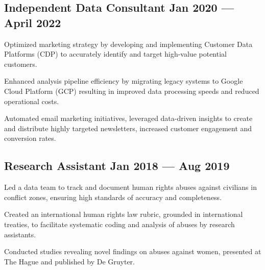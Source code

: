 \documentclass[singlesided, paper=a4, fontsize=10.5pt]{testing-class}
\begin{document}
{    \subsection{Independent Data Consultant \hfill Jan 2020 --- April 2022}
    \begin{zitemize}
        \item Optimized marketing strategy by developing and implementing Customer Data Platforms (CDP) to accurately identify and target high-value potential customers.
        \item Enhanced analysis pipeline efficiency by migrating legacy systems to Google Cloud Platform (GCP) resulting in improved data processing speeds and reduced operational costs.
        \item Automated email marketing initiatives, leveraged data-driven insights to create and distribute highly targeted newsletters, increased customer engagement and conversion rates.
    \end{zitemize}

    \subsection{Research Assistant \hfill Jan 2018 --- Aug 2019}
    \begin{zitemize}
        \item Led a data team to track and document human rights abuses against civilians in conflict zones, ensuring high standards of accuracy and completeness.
        \item Created an international human rights law rubric, grounded in international treaties, to facilitate systematic coding and analysis of abuses by research assistants.
        \item Conducted studies revealing novel findings on abuses against women, presented at The Hague and published by De Gruyter.
    \end{zitemize}
    




}
\end{document}
